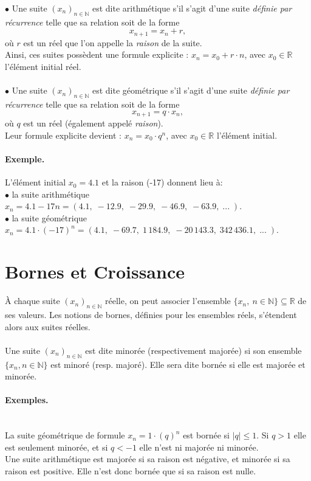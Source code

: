 \documentclass[oneside,11pt,french,table]{book}
\theoremstyle{definition}
\theoremstyle{plain}
\theoremstyle{remark}
\begin{document}
\noindent $\bullet$ Une suite $(x_n)_{n\in \mathbb{N}}$ est dite arithmétique s'il s'agit d'une suite \textit{définie par récurrence} telle que sa relation soit de la forme $$x_{n+1} = x_n + r,$$ où $r$ est un réel que l'on appelle la \textit{raison} de la suite. \\
 Ainsi, ces suites possèdent une formule explicite : $x_n = x_0 + r \cdot n$, avec $x_0 \in \mathbb{R}$ l'élément initial réel.
\\ \\
$\bullet$ Une suite $(x_n)_{n\in \mathbb{N}}$ est dite géométrique s'il s'agit d'une suite \textit{définie par récurrence} telle que sa relation soit de la forme $$x_{n+1} = q \cdot x_n,$$ où $q$ est un réel (également appelé \textit{raison}). \\
Leur formule explicite devient : $x_n = x_0 \cdot q^n$, avec $x_0 \in \mathbb{R}$ l'élément initial.

\paragraph{Exemple.}
L'élément initial $x_0 = 4.1$ et la raison (-17) donnent lieu à: \\
$\bullet$ la suite arithmétique $x_n = 4.1 - 17n = (4.1,\; -12.9,\; -29.9,\; -46.9,\; -63.9, \; ... \; )$. \\
$\bullet$ la suite géométrique $x_n = 4.1 \cdot (-17)^n = (4.1,\; -69.7,\; 1 \, 184.9,\; -20 \, 143.3, \; 342 \, 436.1,\; ... \; )$.
 
\section{Bornes et Croissance}
À chaque suite $(x_n)_{n \in \mathbb{N}}$ réelle, on peut associer l'ensemble $\{ x_n, \ n \in \mathbb{N} \} \subseteq \mathbb{R}$ de ses valeurs. Les notions de bornes, définies pour les ensembles réels, s'étendent alors aux suites réelles. \\ \\
Une suite $(x_n)_{n\in \mathbb{N}}$ est dite minorée (respectivement majorée) si son ensemble $\{ x_n, n \in \mathbb{N} \}$ est minoré (resp. majoré). Elle sera dite bornée si elle est majorée et minorée.

\paragraph{Exemples.} \hspace{1em} \\
La suite géométrique de formule $x_n= 1 \cdot (q)^n$ est bornée si $|q|\leq 1$. Si $q > 1$ elle est seulement minorée, et si $q < -1$ elle n’est ni majorée ni minorée. \\
Une suite arithmétique est majorée si sa raison est négative, et minorée si sa raison est positive. Elle n'est donc bornée que si sa raison est nulle. \\
\end{document}
